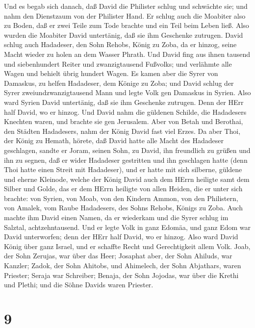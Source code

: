  Und es begab sich danach, daß David die Philister schlug
und schwächte sie; und nahm den Dienstzaum von der Philister Hand.
 Er schlug auch die Moabiter also zu Boden, daß er zwei
Teile zum Tode brachte und ein Teil beim Leben ließ. Also wurden die
Moabiter David untertänig, daß sie ihm Geschenke zutrugen. 
David schlug auch Hadadeser, den Sohn Rehobs, König zu Zoba, da er
hinzog, seine Macht wieder zu holen an dem Wasser Phrath. 
Und David fing aus ihnen tausend und siebenhundert Reiter und
zwanzigtausend Fußvolks; und verlähmte alle Wagen und behielt übrig
hundert Wagen.  Es kamen aber die Syrer von Damaskus, zu
helfen Hadadeser, dem Könige zu Zoba; und David schlug der Syrer
zweiundzwanzigtausend Mann  und legte Volk gen Damaskus in
Syrien. Also ward Syrien David untertänig, daß sie ihm Geschenke
zutrugen. Denn der HErr half David, wo er hinzog.  Und David
nahm die güldenen Schilde, die Hadadesers Knechten waren, und brachte
sie gen Jerusalem.  Aber von Betah und Berothai, den Städten
Hadadesers, nahm der König David fast viel Erzes.  Da aber
Thoi, der König zu Hemath, hörete, daß David hatte alle Macht des
Hadadeser geschlagen,  sandte er Joram, seinen Sohn, zu
David, ihn freundlich zu grüßen und ihn zu segnen, daß er wider
Hadadeser gestritten und ihn geschlagen hatte (denn Thoi hatte einen
Streit mit Hadadeser), und er hatte mit sich silberne, güldene und
eherne Kleinode,  welche der König David auch dem HErrn
heiligte samt dem Silber und Golde, das er dem HErrn heiligte von allen
Heiden, die er unter sich brachte:  von Syrien, von Moab,
von den Kindern Ammon, von den Philistern, von Amalek, vom Raube
Hadadesers, des Sohns Rehobs, Königs zu Zoba.  Auch machte
ihm David einen Namen, da er wiederkam und die Syrer schlug im Salztal,
achtzehntausend.  Und er legte Volk in ganz Edomäa, und
ganz Edom war David unterworfen; denn der HErr half David, wo er hinzog.
 Also ward David König über ganz Israel, und er schaffte
Recht und Gerechtigkeit allem Volk.  Joab, der Sohn
Zerujas, war über das Heer; Josaphat aber, der Sohn Ahiluds, war
Kanzler;  Zadok, der Sohn Ahitobs, und Ahimelech, der Sohn
Abjathars, waren Priester; Seraja war Schreiber;  Benaja,
der Sohn Jojodas, war über die Krethi und Plethi; und die Söhne Davids
waren Priester.

\hypertarget{section-8}{%
\section{9}\label{section-8}}

